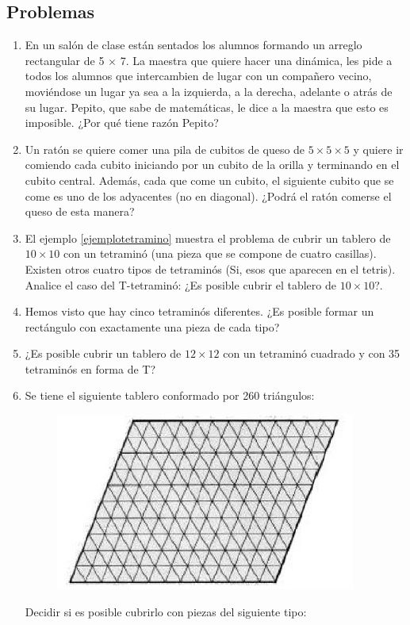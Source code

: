 \subsection{Problemas}

\begin{enumerate}
	\item En un sal\'on de clase est\'an sentados los alumnos formando un arreglo rectangular de 5 $\times$ 7. La maestra
	que quiere hacer una din\'amica, les pide a todos los alumnos que intercambien de lugar con un compañero
	vecino, movi\'endose un lugar ya sea a la izquierda, a la derecha, adelante o atr\'as de su lugar. Pepito, que
	sabe de matem\'aticas, le dice a la maestra que esto es imposible. ¿Por qu\'e tiene raz\'on Pepito?
	\item Un rat\'on se quiere comer una pila de cubitos de queso de $5\times5\times5$ y quiere ir comiendo cada cubito iniciando por un cubito de la orilla y
	terminando en el cubito central. Adem\'as, cada que come un cubito, el siguiente cubito que se come es uno
	de los adyacentes (no en diagonal). ¿Podr\'a el rat\'on comerse el queso de esta manera?
	
	\item El ejemplo \ref{ejemplotetramino} muestra el problema de cubrir un tablero de $10\times 10$ con un tetramin\'o (una pieza que se compone de cuatro casillas). Existen otros cuatro tipos de tetramin\'os (Si, esos que aparecen en el tetris). Analice el caso del T-tetramin\'o: ¿Es posible cubrir el tablero de  $10\times 10$?.
	
	\item Hemos visto que hay cinco tetramin\'os diferentes. ¿Es posible formar un rect\'angulo con exactamente una pieza de cada tipo?
	
	\item ¿Es posible cubrir un tablero de $12\times 12$ con un tetramin\'o cuadrado y con 35 tetramin\'os en forma de T?
	
	\item Se tiene el siguiente tablero conformado por 260 tri\'angulos:
	
	\begin{figure}[h!]
		\centering
		\includegraphics[scale=.7]{imgs/color1.png}
	\end{figure}
	Decidir si es posible cubrirlo con piezas del siguiente tipo:
	

\end{enumerate}
